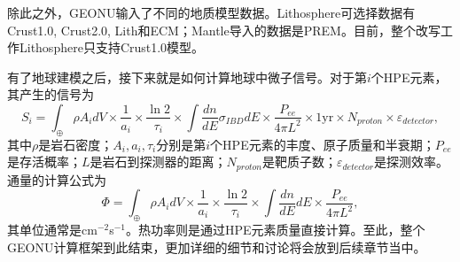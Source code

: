 			除此之外，GEONU输入了不同的地质模型数据。Lithosphere可选择数据有Crust1.0, Crust2.0, Lith和ECM；Mantle导入的数据是PREM。目前，整个改写工作Lithosphere只支持Crust1.0模型。\par
			有了地球建模之后，接下来就是如何计算地球中微子信号。对于第$i$个HPE元素，其产生的信号为
				\begin{equation}
					S_i
					= \int_{\oplus} \rho A_i dV \times \frac{1}{a_i} \times \frac{\ln 2}{\tau_i}\times \int \frac{dn}{dE} \sigma_{IBD} dE \times \frac{P_{ee}}{4\pi L^2} \times 1 \text{yr} \times N_{proton} \times \varepsilon_{detector},
				\end{equation}
			其中$\rho$是岩石密度；$A_i, a_i, \tau_i$分别是第$i$个HPE元素的丰度、原子质量和半衰期；$P_{ee}$是存活概率；$L$是岩石到探测器的距离；$N_{proton}$是靶质子数；$\varepsilon_{detector}$是探测效率。通量的计算公式为
				\begin{equation}
					\Phi
					= \int_{\oplus} \rho A_i dV \times \frac{1}{a_i} \times \frac{\ln 2}{\tau_i}\times \int \frac{dn}{dE} dE \times \frac{P_{ee}}{4\pi L^2},
				\end{equation}
			其单位通常是cm$^{-2}$s$^{-1}$。热功率则是通过HPE元素质量直接计算。至此，整个GEONU计算框架到此结束，更加详细的细节和讨论将会放到后续章节当中。
